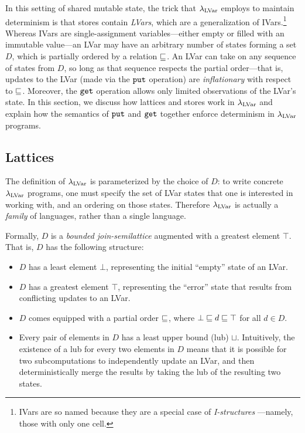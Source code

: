 In this setting of shared mutable state, the trick
that $\lambda_{\textrm{LVar}}$ employs to maintain determinism is that stores
contain {\em LVars}, which are a generalization of
IVars.\footnote{IVars are so named because they are a
    special case of {\em I-structures} \cite{IStructures}---namely,
    those with only one cell.}
Whereas IVars are single-assignment
variables---either empty or filled with an immutable value---an LVar
may have an arbitrary number of states forming a set $D$, which is partially ordered by a relation 
$\sqsubseteq$.  An LVar can take on any sequence of states from 
$D$, so long as that sequence respects the partial order---that is,
updates to the LVar (made via the $\mbox{\texttt{put}}$ operation) are
\emph{inflationary} %
 with respect to $\sqsubseteq$.  Moreover, the 
 $\mbox{\texttt{get}}$ operation allows only limited observations of the LVar's state.  In
this section, we discuss how lattices and stores work in $\lambda_{\textrm{LVar}}$
and explain how the semantics of $\mbox{\texttt{put}}$ and $\mbox{\texttt{get}}$ together enforce determinism
in $\lambda_{\textrm{LVar}}$ programs.

\subsection{Lattices}\label{subsection:domains}

The definition of $\lambda_{\textrm{LVar}}$ is parameterized by the choice of $D$: to write concrete $\lambda_{\textrm{LVar}}$ programs, one must specify
the set of LVar states that one is interested in working with,
and an ordering on those states.
  Therefore
$\lambda_{\textrm{LVar}}$ is actually a \emph{family} of languages, rather than a
single language.

Formally, $D$ is a \emph{bounded} \emph{join-semilattice} augmented
with a greatest element $\top$.  That is, $D$ has the following
structure:
\begin{itemize}
\item $D$ has a least element $\bot$, representing the initial
  ``empty'' state of an LVar.

\item $D$ has a greatest element $\top$, representing the ``error''
  state that results from conflicting updates to an LVar.

\item $D$ comes equipped with a partial order $\sqsubseteq$, where $\bot
  \sqsubseteq d \sqsubseteq \top$ for all $d \in D$.

\item Every pair of elements in $D$ has a least upper bound (lub)
  $\sqcup$.  Intuitively, the existence of a lub for every two
  elements in $D$ means that it is possible for two subcomputations to
  independently update an LVar, and then deterministically merge the
  results by taking the lub of the resulting two states.
\end{itemize}

